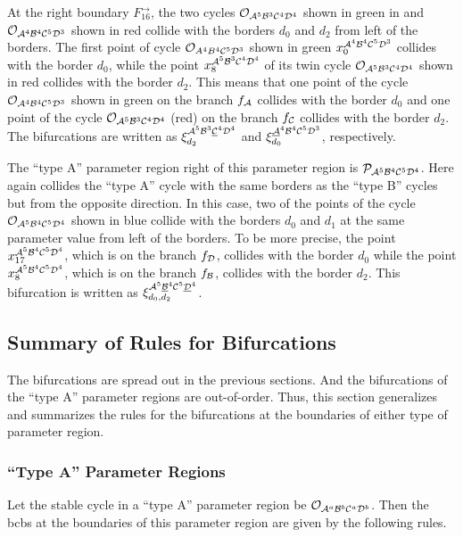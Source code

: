 At the right boundary $F_{16}^\rightarrow$, the two cycles $\mathcal{O}_{\mathcal{A}^5\mathcal{B}^3\mathcal{C}^4\mathcal{D}^4}$ shown in green in  and $\mathcal{O}_{\mathcal{A}^4\mathcal{B}^4\mathcal{C}^5\mathcal{D}^3}$ shown in red collide with the borders $d_0$ and $d_2$ from left of the borders.
The first point of cycle $\mathcal{O}_{A^4B^4\mathcal{C}^5\mathcal{D}^3}$ shown in green $x_{0}^{\mathcal{A}^4\mathcal{B}^4\mathcal{C}^5\mathcal{D}^3}$ collides with the border $d_0$, while the point $x_{8}^{\mathcal{A}^5\mathcal{B}^3\mathcal{C}^4\mathcal{D}^4}$ of its twin cycle $\mathcal{O}_{\mathcal{A}^5\mathcal{B}^3\mathcal{C}^4\mathcal{D}^4}$ shown in red collides with the border $d_2$.
This means that one point of the cycle $\mathcal{O}_{\mathcal{A}^4\mathcal{B}^4\mathcal{C}^5\mathcal{D}^3}$ shown in green on the branch $f_{\mathcal{A}}$ collides with the border $d_0$ and one point of the cycle $\mathcal{O}_{\mathcal{A}^5\mathcal{B}^3\mathcal{C}^4\mathcal{D}^4}$ (red) on the branch $f_{\mathcal{C}}$ collides with the border $d_2$.
The bifurcations are written as $\xi_{d_2}^{\mathcal{A}^5\mathcal{B}^3\underline{\mathcal{C}}^4\mathcal{D}^4}$ and $\xi_{d_0}^{\underline{\mathcal{A}}^4\mathcal{B}^4\mathcal{C}^5\mathcal{D}^3}$, respectively.

The ``type A'' parameter region right of this parameter region is $\mathcal{P}_{\mathcal{A}^5\mathcal{B}^4\mathcal{C}^5\mathcal{D}^4}$.
Here again collides the ``type A'' cycle with the same borders as the ``type B'' cycles but from the opposite direction.
In this case, two of the points of the cycle $\mathcal{O}_{\mathcal{A}^5\mathcal{B}^4\mathcal{C}^5\mathcal{D}^4}$ shown in blue collide with the borders $d_0$ and $d_1$ at the same parameter value from left of the borders.
To be more precise, the point $x_{17}^{\mathcal{A}^5\mathcal{B}^4\mathcal{C}^5\mathcal{D}^4}$, which is on the branch $f_{\mathcal{D}}$, collides with the border $d_0$ while the point $x_{8}^{\mathcal{A}^5\mathcal{B}^4\mathcal{C}^5\mathcal{D}^4}$, which is on the branch $f_{\mathcal{B}}$, collides with the border $d_2$.
This bifurcation is written as $\xi_{d_0, d_2}^{\mathcal{A}^5\underline{\mathcal{B}}^4\mathcal{C}^5\underline{\mathcal{D}}^4}$.

\subsection{Summary of Rules for Bifurcations}
\label{sec:arch.bif.sum}

The bifurcations are spread out in the previous sections.
And the bifurcations of the ``type A'' parameter regions are out-of-order.
Thus, this section generalizes and summarizes the rules for the bifurcations at the boundaries of either type of parameter region.

\subsubsection{``Type A'' Parameter Regions}

Let the stable cycle in a ``type A'' parameter region be $\mathcal{O}_{\mathcal{A}^a\mathcal{B}^b\mathcal{C}^a\mathcal{D}^b}$.
Then the \glspl{bcb} at the boundaries of this parameter region are given by the following rules.

